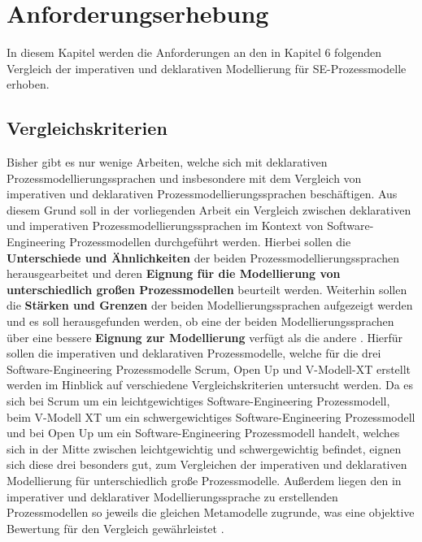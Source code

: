 
\chapter{Anforderungserhebung}\label{sec:chapter5}
In diesem Kapitel werden die Anforderungen an den in Kapitel 6 folgenden Vergleich der imperativen und deklarativen Modellierung für SE-Prozessmodelle erhoben.

\section{Vergleichskriterien}\label{sec:chapter4:Vergleichskriterien}

Bisher gibt es nur wenige Arbeiten, welche sich mit deklarativen Prozessmodellierungssprachen und insbesondere mit dem Vergleich von imperativen und deklarativen Prozessmodellierungssprachen beschäftigen. Aus diesem Grund soll in der vorliegenden Arbeit ein Vergleich zwischen deklarativen und imperativen Prozessmodellierungssprachen im Kontext von Software-Engineering Prozessmodellen durchgeführt werden. Hierbei sollen die \textbf{Unterschiede und Ähnlichkeiten} der beiden Prozessmodellierungssprachen herausgearbeitet und deren \textbf{Eignung für die Modellierung von unterschiedlich großen Prozessmodellen} beurteilt werden. Weiterhin sollen die \textbf{Stärken und Grenzen} der beiden Modellierungssprachen aufgezeigt werden und es soll herausgefunden werden, ob eine der beiden Modellierungssprachen über eine bessere \textbf{Eignung zur Modellierung} verfügt als die andere \cite{list2006evaluation}.\newline
Hierfür sollen die imperativen und deklarativen Prozessmodelle, welche für die drei Software-Engineering Prozessmodelle Scrum, Open Up und V-Modell-XT erstellt werden im Hinblick auf verschiedene Vergleichskriterien untersucht werden. Da es sich bei Scrum um ein leichtgewichtiges Software-Engineering Prozessmodell, beim V-Modell XT um ein schwergewichtiges Software-Engineering Prozessmodell und bei Open Up um ein Software-Engineering Prozessmodell handelt, welches sich in der Mitte zwischen leichtgewichtig und schwergewichtig befindet, eignen sich diese drei besonders gut, zum Vergleichen der imperativen und deklarativen Modellierung für unterschiedlich große Prozessmodelle. Außerdem liegen den in imperativer und deklarativer Modellierungssprache zu erstellenden Prozessmodellen so jeweils die gleichen Metamodelle zugrunde, was eine objektive Bewertung für den Vergleich gewährleistet \cite{list2006evaluation}.  

